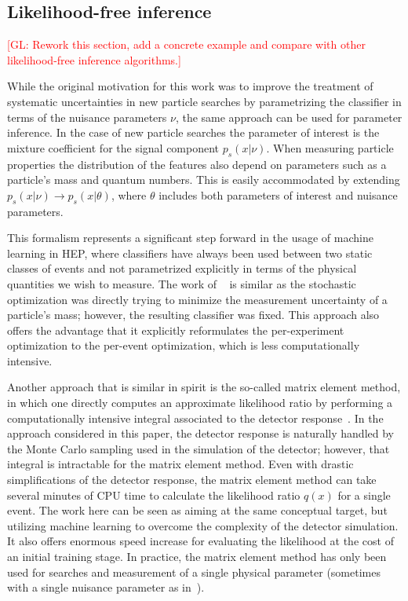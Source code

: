 \documentclass[12pt]{article}
\numberwithin{equation}{section}
\theoremstyle{plain}
\newcommand{\glnote}[1]{\textcolor{red}{[GL: #1]}}
\begin{document}
\subsection{Likelihood-free inference}

\glnote{Rework this section, add a concrete example and compare with other
likelihood-free inference algorithms.}

While the original motivation for this work was to improve the treatment of
systematic uncertainties in new particle searches by parametrizing the
classifier in terms of the nuisance parameters $\nu$, the same approach can be
used for parameter inference. In the case of new particle searches the parameter
of interest is the mixture coefficient for the signal component $p_s(x|\nu)$.
When measuring particle properties the distribution of the features also depend
on parameters such as a particle's mass and quantum numbers. This is easily
accommodated by extending $p_s(x|\nu) \to p_s(x|\theta)$, where $\theta$
includes both parameters of interest and nuisance parameters.

This formalism represents a significant step forward in the usage of machine
learning in HEP, where classifiers have always been used between two static
classes of events and not parametrized explicitly in terms of the physical
quantities we wish to measure. The work of  ~\citep{Whiteson:2006ws} is similar
as the stochastic optimization was directly trying to minimize the measurement
uncertainty of a particle's mass; however, the resulting classifier was fixed.
This approach also offers the advantage that it explicitly reformulates the
per-experiment optimization to the per-event optimization, which is less
computationally intensive.

Another approach that is similar in spirit is the so-called matrix element
method, in which one  directly computes an approximate likelihood ratio by
performing a computationally intensive integral associated to the detector
response~\citep{Volobouev:2011vb}. In the approach considered in this paper, the
detector response is naturally handled by the Monte Carlo sampling used in the
simulation of the detector; however, that integral is intractable for the matrix
element method. Even with drastic simplifications of the detector response, the
matrix element method can take several minutes of CPU time to calculate the
likelihood ratio $q(x)$ for a single event. The work here can be seen as aiming
at the same conceptual target, but utilizing machine learning to overcome the
complexity of the detector simulation. It also offers enormous speed increase
for evaluating the likelihood at the cost of an initial training stage. In
practice, the matrix element method has only been used for searches and
measurement of a single physical parameter (sometimes with a single nuisance
parameter as in~\citep{Aaltonen:2010yz}).
\end{document}
